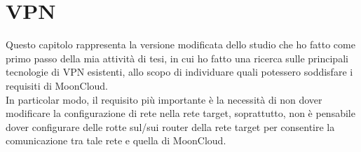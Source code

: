 \chapter{VPN}

Questo capitolo rappresenta la versione modificata dello studio che ho fatto
come primo passo della mia attività di tesi, in cui ho fatto una ricerca
sulle principali tecnologie di VPN esistenti, allo scopo di individuare
quali potessero soddisfare i requisiti di MoonCloud.\\
In particolar modo, il requisito più importante è la necessità di non dover
modificare la configurazione di rete nella rete target, soprattutto, non è
pensabile dover configurare delle rotte sul/sui router della rete target per
consentire la comunicazione tra tale rete e quella di MoonCloud.







